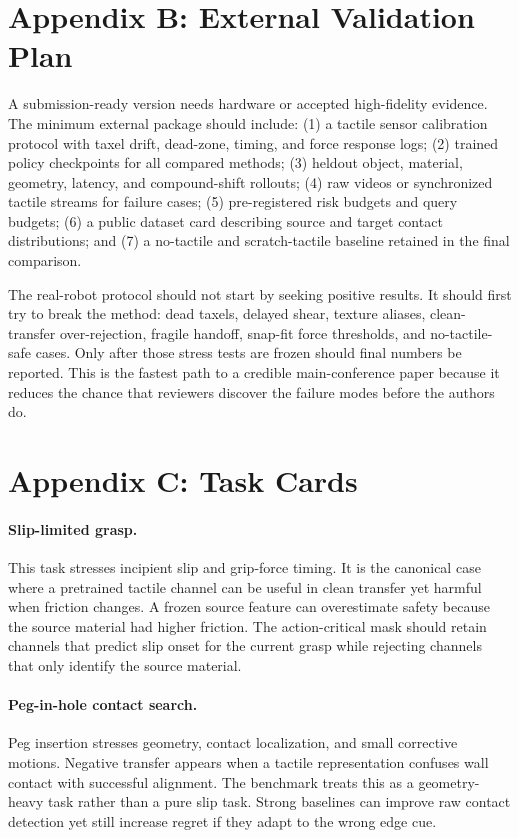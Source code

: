 \documentclass{article}
\begin{document}
\section{Appendix B: External Validation Plan}
A submission-ready version needs hardware or accepted high-fidelity evidence. The minimum external package should include: (1) a tactile sensor calibration protocol with taxel drift, dead-zone, timing, and force response logs; (2) trained policy checkpoints for all compared methods; (3) heldout object, material, geometry, latency, and compound-shift rollouts; (4) raw videos or synchronized tactile streams for failure cases; (5) pre-registered risk budgets and query budgets; (6) a public dataset card describing source and target contact distributions; and (7) a no-tactile and scratch-tactile baseline retained in the final comparison.

The real-robot protocol should not start by seeking positive results. It should first try to break the method: dead taxels, delayed shear, texture aliases, clean-transfer over-rejection, fragile handoff, snap-fit force thresholds, and no-tactile-safe cases. Only after those stress tests are frozen should final numbers be reported. This is the fastest path to a credible main-conference paper because it reduces the chance that reviewers discover the failure modes before the authors do.

\clearpage
\section{Appendix C: Task Cards}
\paragraph{Slip-limited grasp.}
This task stresses incipient slip and grip-force timing. It is the canonical case where a pretrained tactile channel can be useful in clean transfer yet harmful when friction changes. A frozen source feature can overestimate safety because the source material had higher friction. The action-critical mask should retain channels that predict slip onset for the current grasp while rejecting channels that only identify the source material.

\paragraph{Peg-in-hole contact search.}
Peg insertion stresses geometry, contact localization, and small corrective motions. Negative transfer appears when a tactile representation confuses wall contact with successful alignment. The benchmark treats this as a geometry-heavy task rather than a pure slip task. Strong baselines can improve raw contact detection yet still increase regret if they adapt to the wrong edge cue.
\end{document}
